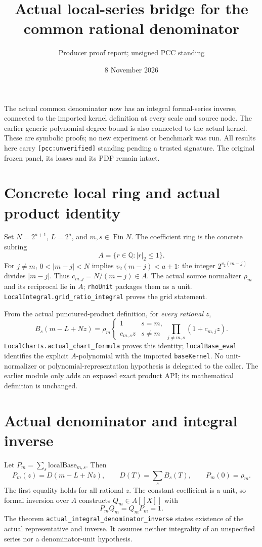 \documentclass[10pt]{article}
\title{Actual local-series bridge for the common rational denominator}
\author{Producer proof report; unsigned PCC standing}
\date{8 November 2026}
\begin{document}
\maketitle
The actual common denominator now has an integral formal-series inverse,
connected to the imported kernel definition at every scale and source node.
The earlier generic polynomial-degree bound is also connected to the actual
kernel. These are symbolic proofs; no new experiment or benchmark was run.
All results here carry \texttt{[pcc:unverified]} standing pending a trusted
signature. The original frozen panel, its losses and its PDF remain intact.

\section*{Concrete local ring and actual product identity}
Set $N=2^{a+1}$, $L=2^a$, and $m,s\in\operatorname{Fin}N$.
The coefficient ring is the concrete subring
\[A=\{r\in\mathbb Q:\lvert r\rvert_2\le1\}.\]
For $j\ne m$, $0<|m-j|<N$ implies $v_2(m-j)<a+1$:
the integer $2^{v_2(m-j)}$ divides $|m-j|$. Thus
$c_{m,j}=N/(m-j)\in A$. The actual source normalizer $\rho_m$ and its
reciprocal lie in $A$; \texttt{rhoUnit} packages them as a unit.
\texttt{LocalIntegral.grid\_ratio\_integral} proves the grid statement.

From the actual punctured-product definition, for \emph{every rational} $z$,
\[ B_s(m-L+Nz)=\rho_m
 \begin{cases}1&s=m,\\c_{m,s}z&s\ne m\end{cases}
 \prod_{j\ne m,s}(1+c_{m,j}z).\]
\texttt{LocalCharts.actual\_chart\_formula} proves this identity;
\texttt{localBase\_eval} identifies the explicit $A$-polynomial with the
imported \texttt{baseKernel}. No unit-normalizer or polynomial-representation
hypothesis is delegated to the caller. The earlier module only adds an
exposed exact product API; its mathematical definition is unchanged.

\section*{Actual denominator and integral inverse}
Let $P_m=\sum_s\mathrm{localBase}_{m,s}$. Then
\[P_m(z)=D(m-L+Nz),\qquad D(T)=\sum_s B_s(T),\qquad P_m(0)=\rho_m.\]
The first equality holds for all rational $z$. The constant coefficient is a
unit, so formal inversion over $A$ constructs $Q_m\in A[[X]]$ with
\[P_m Q_m=Q_mP_m=1.\]
The theorem \texttt{actual\_integral\_denominator\_inverse} states existence
of the actual representative and inverse. It assumes neither integrality of
an unspecified series nor a denominator-unit hypothesis.
\end{document}
